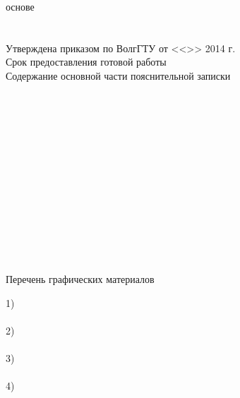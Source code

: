 \begin{titlepage}
{{        основе\hspace{1.7em}}}\\
    \vspace{0.5em}\hspace*{12mm}\underline{}\\
    \vspace{0.5em}\hspace*{12mm}\underline{\hspace{0.93\textwidth}}\\
    \vspace{1em}Утверждена приказом по ВолгГТУ от <<\underline{}>> \underline{}
        2014 г. \textnumero \underline{\hspace{3em}}\\
    Срок предоставления готовой работы \\
    \vspace{0.5em}Содержание основной части пояснительной записки\\
    \LINE{\textwidth}\\\LINE{\textwidth}\\\LINE{\textwidth}\\\LINE{\textwidth}\\\LINE{\textwidth}\\
    \LINE{\textwidth}\\\LINE{\textwidth}\\\LINE{\textwidth}\\\LINE{\textwidth}\\\LINE{\textwidth}\\
    \LINE{\textwidth}\\\LINE{\textwidth}\\\LINE{\textwidth}\\
    \newpage
    \thispagestyle{empty}
    \begin{center}
        Перечень графических материалов
    \end{center}
    1) \\\LINE{\textwidth}\\
    2) \\\LINE{\textwidth}\\
    3) \\\LINE{\textwidth}\\
    4) \\\LINE{\textwidth}\\

\end{titlepage}

